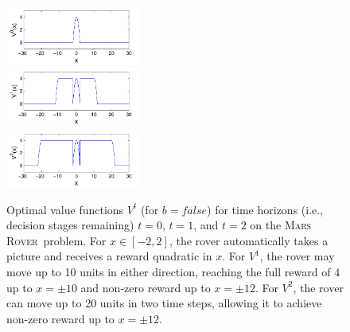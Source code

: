 \documentclass[letterpaper]{article}
\newcommand{\MarsRover}{\textsc{Mars Rover}}
\newcommand{\false}{\mathit{false}}
\begin{document}
\begin{figure}[t!]
\centering
\includegraphics[width=0.4\textwidth]{Figures1/v1_mr.pdf}\\
\includegraphics[width=0.4\textwidth]{Figures1/v2_mr.pdf}\\
\includegraphics[width=0.4\textwidth]{Figures1/v3_mr.pdf}
\vspace{-2mm}
\caption{\footnotesize Optimal value functions $V^t$ (for $b =
\false$) for time horizons (i.e., decision stages remaining) $t=0$,
$t=1$, and $t=2$ on the \MarsRover\ problem.  For $x \in [-2,2]$, the
rover automatically takes a picture and receives a reward quadratic in
$x$.  For $V^1$, the rover may move up to 10 units in
either direction, reaching the full reward of $4$ up
to $x = \pm 10$ and non-zero reward up to $x = \pm 12$. 
For $V^2$, the rover can move up to 20 units in two time steps,
allowing it to achieve non-zero reward up to $x = \pm 12$.}
\label{fig:opt_graph}
\end{figure}
\end{document}
